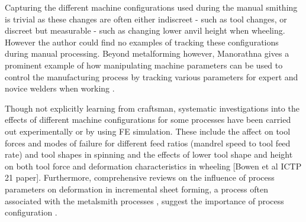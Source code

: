 Capturing the different machine configurations used during the manual smithing is trivial as these changes are often either indiscreet - such as tool changes, or discreet but measurable - such as changing lower anvil height when wheeling. However the author could find no examples of tracking these configurations during manual processing. Beyond metalforming however, Manorathna gives a prominent example of how manipulating machine parameters can be used to control the manufacturing process by tracking various parameters for expert and novice welders when working \citep{Manorathna2017HumanAutomation}. 

Though not explicitly learning from craftsman, systematic investigations into the effects of different machine configurations for some processes have been carried out experimentally or by using FE simulation. These include the affect on tool forces and modes of failure for different feed ratios (mandrel speed to tool feed rate) \citep{Sugar2016AnalysisSteels,Essa2010OptimizationAnalysis} and tool shapes \citep{El-Khabeery1991OnCups,Essa2010OptimizationAnalysis} in spinning and the effects of lower tool shape and height on both tool force and deformation characteristics in wheeling [Bowen et al ICTP 21 paper]. Furthermore, comprehensive reviews on the influence of process parameters on deformation in incremental sheet forming, a process often associated with the metalsmith processes \citep{Music2012TheTools}, suggest the importance of process configuration \citep{Gatea2016ReviewForming,Gohil2021ReviewProcess}.






